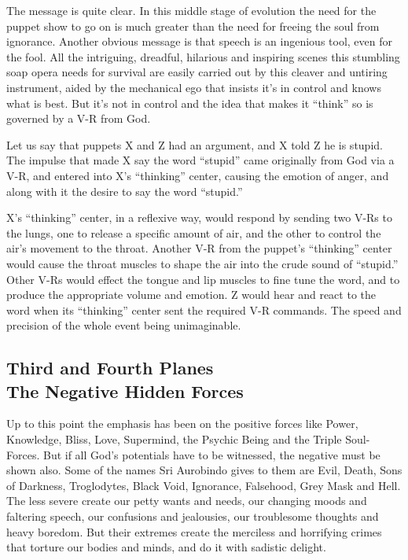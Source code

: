 \documentclass[12pt,a4paper]{book}
\begin{document}
The message is quite clear. In this middle stage of evolution the need
for the puppet show to go on is much greater than the need for freeing
the soul from ignorance. Another obvious message is that speech is an
ingenious tool, even for the fool. All the intriguing, dreadful,
hilarious and inspiring scenes this stumbling soap opera needs for
survival are easily carried out by this cleaver and untiring
instrument, aided by the mechanical ego that insists it's in control
and knows what is best. But it's not in control and the idea that
makes it ``think'' so is governed by a V-R from God.

Let us say that puppets X and Z had an argument, and X told Z he is
stupid. The impulse that made X say the word ``stupid'' came
originally from God via a V-R, and entered into X's ``thinking''
center, causing the emotion of anger, and along with it the desire to
say the word ``stupid.''

X's ``thinking'' center, in a reflexive way, would respond by sending
two V-Rs to the lungs, one to release a specific amount of air, and
the other to control the air's movement to the throat. Another V-R
from the puppet's ``thinking'' center would cause the throat muscles
to shape the air into the crude sound of ``stupid.''  Other V-Rs would
effect the tongue and lip muscles to fine tune the word, and to
produce the appropriate volume and emotion. Z would hear and react to
the word when its ``thinking'' center sent the required V-R
commands. The speed and precision of the whole event being
unimaginable.

\newpage
\begin{center}\section*{Third and Fourth Planes\\The Negative Hidden Forces}\end{center}


Up to this point the emphasis has been on the positive forces like
Power, Knowledge, Bliss, Love, Supermind, the Psychic Being and the
Triple Soul-Forces. But if all God's potentials have to be witnessed,
the negative must be shown also. Some of the names Sri Aurobindo gives
to them are Evil, Death, Sons of Darkness, Troglodytes, Black Void,
Ignorance, Falsehood, Grey Mask and Hell. The less severe create our
petty wants and needs, our changing moods and faltering speech, our
confusions and jealousies, our troublesome thoughts and heavy boredom.
But their extremes create the merciless and horrifying crimes that
torture our bodies and minds, and do it with sadistic delight.
\end{document}
